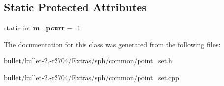\subsection*{Static Protected Attributes}
\begin{DoxyCompactItemize}
\item 
\hypertarget{class_point_set_ae04609bceeb7e7e18a583ab0f4dc9399}{static int {\bfseries m\+\_\+pcurr} = -\/1}\label{class_point_set_ae04609bceeb7e7e18a583ab0f4dc9399}

\end{DoxyCompactItemize}


The documentation for this class was generated from the following files\+:\begin{DoxyCompactItemize}
\item 
bullet/bullet-\/2.-\/r2704/\+Extras/sph/common/point\+\_\+set.\+h\item 
bullet/bullet-\/2.-\/r2704/\+Extras/sph/common/point\+\_\+set.\+cpp\end{DoxyCompactItemize}
